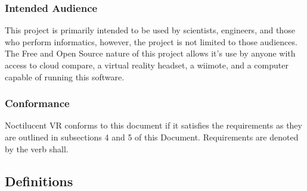 \subsubsection{Intended Audience}

This project is primarily intended to be used by scientists, engineers, and those who perform informatics, however, the project is not limited to those audiences.
The Free and Open Source nature of this project allows it's use by anyone with access to cloud compare, a virtual reality headset, a wiimote, and a computer capable of running this software.

\subsubsection{Conformance}

Noctilucent VR conforms to this document if it satisfies the requirements as they are outlined in subsections 4 and 5 of this Document. Requirements are denoted by the verb shall.

\subsection{Definitions}

